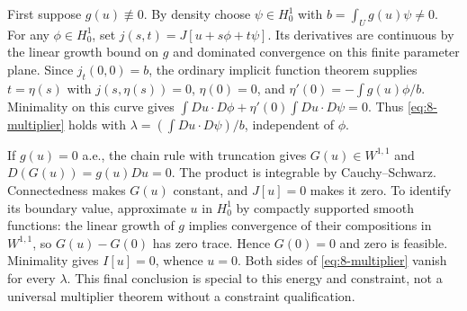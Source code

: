 \begin{expandedproof}
First suppose $g(u)\not\equiv0$. By density choose $\psi\in H^1_0$ with
$b=\int_Ug(u)\psi\ne0$. For any $\phi\in H^1_0$, set
$j(s,t)=J[u+s\phi+t\psi]$. Its derivatives are continuous by the
linear growth bound on $g$ and dominated convergence on this finite
parameter plane. Since $j_t(0,0)=b$, the ordinary implicit function
theorem supplies $t=\eta(s)$ with $j(s,\eta(s))=0$,
$\eta(0)=0$, and $\eta'(0)=-\int g(u)\phi/b$.
Minimality on this curve gives
$\int Du\cdot D\phi+\eta'(0)\int Du\cdot D\psi=0$.
Thus \eqref{eq:8-multiplier} holds with
$\lambda=(\int Du\cdot D\psi)/b$, independent of $\phi$.

If $g(u)=0$ a.e., the chain rule with truncation gives
$G(u)\in W^{1,1}$ and $D(G(u))=g(u)Du=0$.
The product is integrable by Cauchy--Schwarz. Connectedness makes $G(u)$
constant, and $J[u]=0$ makes it zero. To identify its boundary value,
approximate $u$ in $H^1_0$ by compactly supported smooth functions:
the linear growth of $g$ implies convergence of their compositions in
$W^{1,1}$, so $G(u)-G(0)$ has zero trace. Hence $G(0)=0$ and zero is
feasible. Minimality gives $I[u]=0$, whence $u=0$. Both sides of
\eqref{eq:8-multiplier} vanish for every $\lambda$.
This final conclusion is special to this energy and constraint, not a
universal multiplier theorem without a constraint qualification.
\end{expandedproof}
\Needspace{55mm}

\Needspace{45mm}
